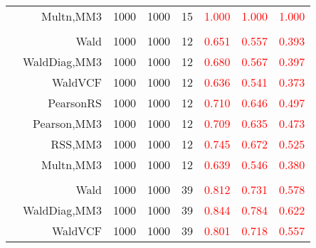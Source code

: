 \documentclass[
]{article}
\begin{document}
\begin{table}[H]
{\begin{tabular}[t]{lrrrrrrr}
\hspace{1em} & Multn,MM3 & 1000 & 1000 & 15 & \textcolor{red}{1.000} & \textcolor{red}{1.000} & \textcolor{red}{1.000}\\
\cmidrule{1-8}
\addlinespace[0.3em]
\multicolumn{8}{l}{\textbf{2F 10V}}\\
\hspace{1em} & Wald & 1000 & 1000 & 12 & \textcolor{red}{0.651} & \textcolor{red}{0.557} & \textcolor{red}{0.393}\\

\hspace{1em} & WaldDiag,MM3 & 1000 & 1000 & 12 & \textcolor{red}{0.680} & \textcolor{red}{0.567} & \textcolor{red}{0.397}\\

\hspace{1em} & WaldVCF & 1000 & 1000 & 12 & \textcolor{red}{0.636} & \textcolor{red}{0.541} & \textcolor{red}{0.373}\\

\hspace{1em} & PearsonRS & 1000 & 1000 & 12 & \textcolor{red}{0.710} & \textcolor{red}{0.646} & \textcolor{red}{0.497}\\

\hspace{1em} & Pearson,MM3 & 1000 & 1000 & 12 & \textcolor{red}{0.709} & \textcolor{red}{0.635} & \textcolor{red}{0.473}\\

\hspace{1em} & RSS,MM3 & 1000 & 1000 & 12 & \textcolor{red}{0.745} & \textcolor{red}{0.672} & \textcolor{red}{0.525}\\

\hspace{1em} & Multn,MM3 & 1000 & 1000 & 12 & \textcolor{red}{0.639} & \textcolor{red}{0.546} & \textcolor{red}{0.380}\\
\cmidrule{1-8}
\addlinespace[0.3em]
\multicolumn{8}{l}{\textbf{3F 15V}}\\
\hspace{1em} & Wald & 1000 & 1000 & 39 & \textcolor{red}{0.812} & \textcolor{red}{0.731} & \textcolor{red}{0.578}\\

\hspace{1em} & WaldDiag,MM3 & 1000 & 1000 & 39 & \textcolor{red}{0.844} & \textcolor{red}{0.784} & \textcolor{red}{0.622}\\

\hspace{1em} & WaldVCF & 1000 & 1000 & 39 & \textcolor{red}{0.801} & \textcolor{red}{0.718} & \textcolor{red}{0.557}\\


\end{tabular}}
\end{table}
\end{document}
